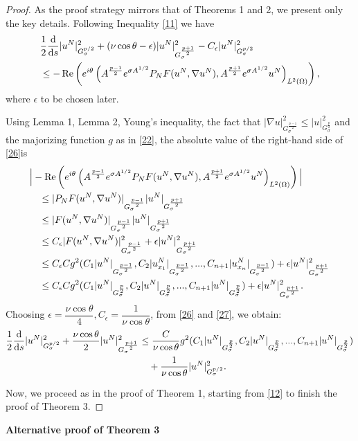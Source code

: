 \documentclass[12pt]{article}
\theoremstyle{plain}
\theoremstyle{remark}
\newcommand{\dd}{\mathrm{d}}
\newcommand{\Gspace}{G_\sigma^{p/2}}
\begin{document}
\begin{proof}
As the proof strategy mirrors that of Theorems 1 and 2, we present only the key details.
Following Inequality \eqref{11} we have
\begin{align}
& \frac{1}{2} \frac{\dd}{\dd s} |u^N|_{G_\sigma^{p/2}}^2 + (\nu \cos\theta -\epsilon)|u^N|_{G_\sigma^{\frac{p+1}{2}}}^2 -C_{\epsilon}|u^N|_{
G_\sigma^{p/2}
}^2 \notag \\
&\leq -\operatorname{Re}\left( e^{i\theta}
\left( A^\frac{p-1}{2} e^{\sigma A^{1/2}} P_N F(u^N,\nabla u^N), A^\frac{p+1}{2} e^{\sigma A^{1/2}} u^N \right)_ {L^2(\Omega)}\right),\label{26}
\end{align}
where $\epsilon$ to be chosen later.

Using Lemma 1, Lemma 2, Young's inequality, the fact that  $|\nabla u|^2_{G_{\sigma}^{\frac{p-1}{2}}}\leq | u|^2_{G_{\sigma}^{\frac{p}{2}}}$  and the majorizing function $g$ as in \eqref{22}, the absolute value of the  right-hand side of \eqref{26}is
\begin{align}
&\Big|-\operatorname{Re}\left( e^{i\theta}
\left( A^{\frac{p-1}{2}} e^{\sigma A^{1/2}} P_N F(u^N,\nabla u^N), A^{\frac{p+1}{2}} e^{\sigma A^{1/2}} u^N \right)_ {L^2(\Omega)}\right)\Big| \notag \\
&\quad\leq  |P_NF(u^N,\nabla u^N)|_{G^{\frac{p-1}{2}}_{\sigma}}|u^N|_{G^{\frac{p+1}{2}}_{\sigma}}\notag \\
&\quad \leq  |F(u^N,\nabla u^N)|_{G^{\frac{p-1}{2}}_{\sigma}}|u^N|_{G^{\frac{p+1}{2}}_{\sigma}}\notag \\
&\quad \leq C_{\epsilon}|F(u^N,\nabla u^N)|^2_{G^{\frac{p-1}{2}}_{\sigma}}+\epsilon|u^N|^2_{G^{\frac{p+1}{2}}_{\sigma}}\notag \\
&\quad \leq C_{\epsilon}C g^2(C_1 |u^N|_{G_\sigma^{\frac{p-1}{2}}},C_2 |u^N_{x_1}|_{G_\sigma^{\frac{p-1}{2}}},...,C_{n+1} |u^N_{x_n}|_{G_\sigma^{\frac{p-1}{2}}})+\epsilon|u^N|^2_{G^{\frac{p+1}{2}}_{\sigma}}\notag \\
&\quad \leq C_{\epsilon}C g^2(C_1 |u^N|_{G_\sigma^{\frac{p}{2}}},C_2 |u^N|_{G_\sigma^{\frac{p}{2}}},...,C_{n+1} |u^N|_{G_\sigma^{\frac{p}{2}}})+\epsilon|u^N|^2_{G^{\frac{p+1}{2}}_{\sigma}}.\label{27}
\end{align}
Choosing $\epsilon=\dfrac{\nu \cos\theta}{4},C_{\epsilon}=\dfrac{1}{\nu \cos\theta}$, from \eqref{26} and \eqref{27}, we obtain:
\begin{align*}
\frac{1}{2} \frac{\dd}{\dd s} |u^N|^2_{\Gspace} + \frac{\nu\cos\theta}{2}|u^N|_{G_\sigma^{\frac{p+1}{2}}}^2 &\leq \frac{C}{\nu \cos\theta} g^2(C_1 |u^N|_{G_\sigma^{\frac{p}{2}}},C_2 |u^N|_{G_\sigma^{\frac{p}{2}}},...,C_{n+1} |u^N|_{G_\sigma^{\frac{p}{2}}})\notag\\&\quad+\frac{1}{\nu \cos\theta}|u^N|_{
G_\sigma^{p/2}
}^2.
\end{align*}

Now, we proceed as in the proof of Theorem 1, starting from \eqref{12} to finish the proof of Theorem 3.
\end{proof}
\noindent \textbf{Alternative proof of Theorem 3}
\end{document}
